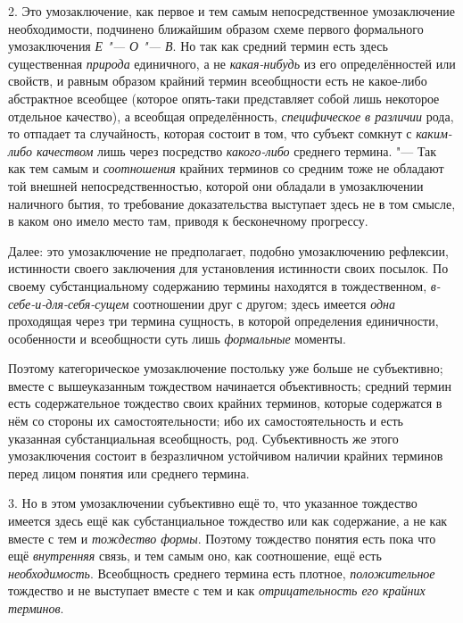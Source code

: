 2. Это умозаключение, как первое и тем самым непосредственное
умозаключение необходимости, подчинено ближайшим образом схеме первого
формального умозаключения {\em Е "--- О "--- В}. Но так как средний
термин есть здесь существенная
{\em природа} единичного,
а не {\em какая-нибудь}
из его определённостей или свойств, и равным образом крайний
термин всеобщности есть не какое-либо абстрактное всеобщее (которое
опять-таки представляет собой лишь некоторое отдельное качество), а
всеобщая определённость,
{\em специфическое в различии}
рода, то отпадает та случайность, которая состоит в том, что
субъект сомкнут с {\em каким-либо
качеством} лишь через посредство
{\em какого-либо}
среднего термина. "--- Так как тем самым и
{\em соотношения} крайних
терминов со средним тоже не обладают той внешней непосредственностью,
которой они обладали в умозаключении наличного бытия, то требование
доказательства выступает здесь не в том смысле, в каком оно
имело место там, приводя к бесконечному прогрессу.

Далее: это умозаключение не предполагает, подобно
умозаключению рефлексии, истинности своего заключения для установления
истинности своих посылок. По своему субстанциальному содержанию термины
находятся в тождественном,
{\em в-себе-и-для-себя-сущем}
соотношении друг с другом; здесь имеется
{\em одна} проходящая
через три термина сущность, в которой определения единичности, особенности
и всеобщности суть лишь
{\em формальные}
моменты.

Поэтому категорическое умозаключение постольку уже больше не
субъективно; вместе с вышеуказанным тождеством начинается объективность;
средний термин есть содержательное тождество своих крайних терминов,
которые содержатся в нём со стороны их самостоятельности; ибо их
самостоятельность и есть указанная субстанциальная всеобщность, род.
Субъективность же этого умозаключения состоит в безразличном устойчивом
наличии крайних терминов перед лицом понятия или среднего термина.

3. Но в этом умозаключении субъективно ещё то, что указанное
тождество имеется здесь ещё как субстанциальное тождество или как
содержание, а не как вместе с тем и
{\em тождество формы}.
Поэтому тождество понятия есть пока что ещё
{\em внутренняя} связь, и
тем самым оно, как соотношение, ещё есть
{\em необходимость}.
Всеобщность среднего термина есть плотное,
{\em положительное}
тождество и не выступает вместе с тем и как
{\em отрицательность его крайних
терминов}.

